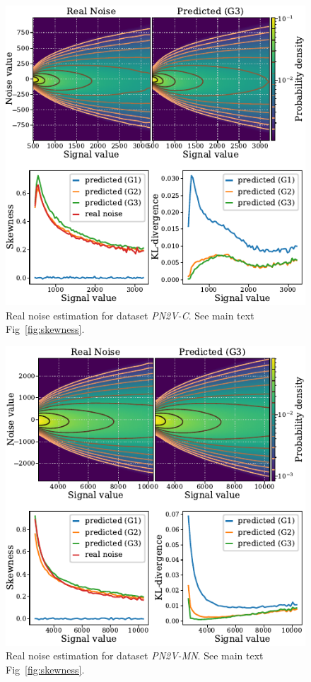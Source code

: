 \documentclass[lettersize,journal]{IEEEtran}
\begin{document}
\begin{figure}[ht]
\begin{center}
\centerline{\includegraphics[width=\columnwidth]{fig_skewness_pn2v-C.pdf}}
\caption{Real noise estimation for dataset \textit{PN2V-C}. See main text Fig~\ref{fig:skewness}.
}
\end{center}
\end{figure}

\begin{figure}[ht]
\begin{center}
\centerline{\includegraphics[width=\columnwidth]{fig_skewness_pn2v-MN.pdf}}
\caption{Real noise estimation for dataset \textit{PN2V-MN}. See main text Fig~\ref{fig:skewness}.
}
\end{center}
\end{figure}
\end{document}
